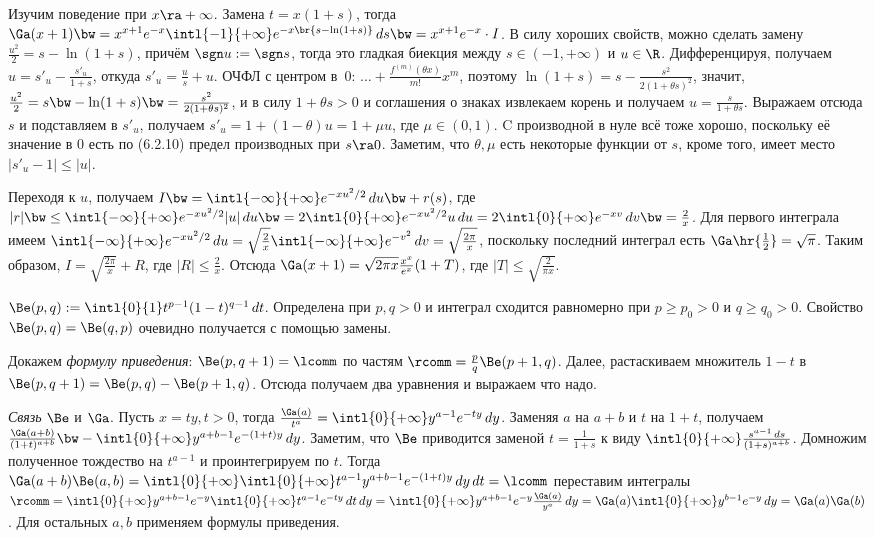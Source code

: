 \documentclass[a4paper]{article}
\newcommand{\intlii}{\intl{-\infty}{+\infty}}
\newcommand{\intloi}{\intl{0}{+\infty}}
\begin{document}
Изучим поведение при $x\ra +\infty$. Замена $t=x(1+s)$, тогда
$\Ga(x+1)\bw=x^{x+1}e^{-x}\intl{-1}{+\infty}e^{-x\br{s-\ln(1+s)}}\,ds\bw=x^{x+1}e^{-x}\cdot I$. В силу
хороших свойств, можно сделать замену $\frac{u^2}{2}=s-\ln(1+s)$, причём $\sgn u := \sgn s$, тогда
это гладкая биекция между $s\in(-1,+\infty)$ и $u\in\R$. Дифференцируя, получаем
$u=s'_u-\frac{s'_u}{1+s}$, откуда $s'_u=\frac{u}{s}+u$. ОЧФЛ с центром в~0: $\dots +
\frac{f^{(m)}(\theta x)}{m!}x^m$, поэтому $\ln(1+s)=s -\frac{s^2}{2(1+\theta s)^2}$, значит,
$\frac{u^2}{2}=s\bw-\ln(1+s)\bw=\frac{s^2}{2(1+\theta s)^2}$, и в силу $1+\theta s > 0$ и соглашения о
знаках извлекаем корень и получаем $u=\frac{s}{1+\theta s}$. Выражаем отсюда $s$ и подставляем в
$s'_u$, получаем $s'_u = 1 + (1-\theta)u = 1 + \mu u$, где $\mu \in (0,1)$. C производной в нуле
всё тоже хорошо, поскольку её значение в 0 есть по (6.2.10) предел производных при $s\ra0$.
Заметим, что $\theta, \mu$ есть некоторые функции от $s$, кроме того, имеет место $|s'_u-1| \le
|u|$.

Переходя к $u$, получаем $I \bw= \intlii e^{-x u^2/2}\,du \bw+ r(s)$, где $|r| \bw\le \intlii
e^{-x u^2/2}|u|\,du\bw= 2\intloi e^{-x u^2/2} u\,d u = 2\intloi e^{-xv}\,d v \bw=\frac{2}{x}$. Для первого
интеграла имеем $\intlii e^{-x u^2/2}\,d u= \sqrt{\frac{2}{x}}\intlii e^{-v^2}\,d v
=\sqrt{\frac{2\pi}{x}}$, поскольку последний интеграл есть $\Ga\hr{\frac{1}{2}}=\sqrt{\pi}$. Таким
образом, $I=\sqrt{\frac{2\pi}{x}} + R$, где $|R| \le \frac{2}{x}$. Отсюда
$\Ga(x+1)=\sqrt{2\pi x}\frac{x^x}{e^x}(1+T)$, где $|T| \le \sqrt{\frac{2}{\pi x}}$.

$\Be(p,q) := \intl{0}{1}t^{p-1}(1-t)^{q-1}\,d t$. Определена при $p,q>0$ и интеграл сходится
равномерно при $p \ge p_0 > 0$ и $q \ge q_0 > 0$. Свойство $\Be(p,q)=\Be(q,p)$ очевидно получается
с помощью замены.

Докажем \emph{формулу приведения}: $\Be(p,q+1)=\lcomm$ по частям $\rcomm =\frac{p}{q}\Be(p+1,q)$.
Далее, растаскиваем множитель $1-t$ в $\Be(p,q+1)=\Be(p,q)-\Be(p+1,q)$. Отсюда получаем
два уравнения и выражаем что надо.

\emph{Связь} $\Be$ и $\Ga$. Пусть $x=ty,t>0$, тогда $\frac{\Ga(a)}{t^a}=\intloi y^{a-1}e^{-ty}\,d
y$. Заменяя $a$ на $a+b$ и $t$ на $1+t$, получаем $\frac{\Ga(a+b)}{(1+t)^{a+b}}\bw-\intloi
y^{a+b-1}e^{-(1+t)y}\,d y$. Заметим, что $\Be$ приводится заменой $t=\frac{1}{1+s}$ к виду
$\intloi\frac{s^{a-1}\,d s}{(1+s)^{a+b}}$. Домножим полученное тождество на $t^{a-1}$ и
проинтегрируем по $t$. Тогда $\Ga(a+b)\Be(a,b)=\intloi \intloi t^{a-1}y^{a+b-1}e^{-(1+t)y}\,d y
\,d t=\lcomm$ переставим интегралы $\rcomm =\intloi y^{a+b-1}e^{-y}\intloi t^{a-1}e^{-ty}\,d t
\,d y=\intloi y^{a+b-1}e^{-y}\frac{\Ga(a)}{y^a}\,d y = \Ga(a)\intloi y^{b-1}e^{-y}\,d
y=\Ga(a)\Ga(b)$. Для остальных $a,b$ применяем формулы приведения.
\end{document}
